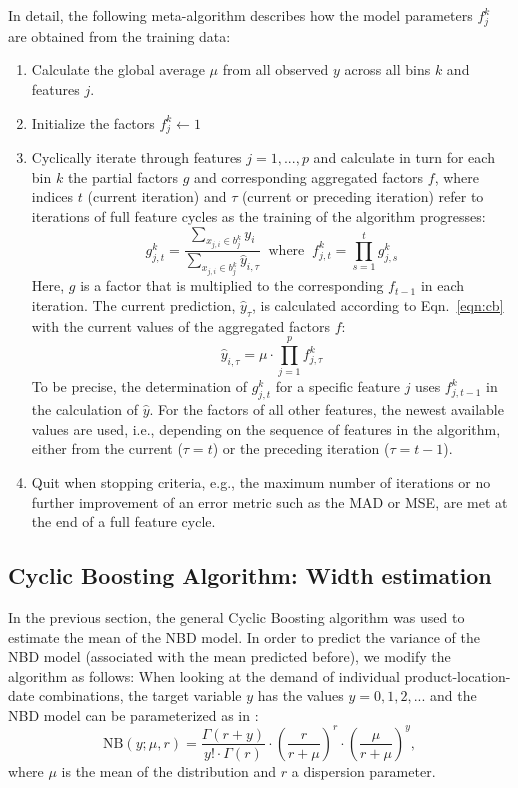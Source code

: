 \documentclass[BCOR=1mm, DIV=calc,10pt,
twoside=true,
twocolumn,
headings=normal]{scrartcl}
\newcommand{\eqn}{Eqn.~}
\begin{document}
In detail, the following meta-algorithm describes how the model parameters $f^k_j$ are obtained from the training data:
\begin{enumerate}
\item{Calculate the global average $\mu$ from all observed $y$ across all bins $k$ and features $j$.}
\item{Initialize the factors $f^k_j \leftarrow 1$}
\item{Cyclically iterate through features $j = 1,...,p $ and calculate in turn for each bin $k$ the partial factors $g$ and corresponding aggregated factors $f$, where indices $t$ (current iteration) and $\tau$ (current or preceding iteration) refer to iterations of full feature cycles as the training of the algorithm progresses:
\begin{equation} \label{factors}
g^k_{j,t} = \frac{\sum \limits_{x_{j,i} \in b^k_j} y_i}{\sum \limits_{x_{j,i} \in b^k_j} \hat{y}_{i,\tau}}\;\; \mathrm{where} \; \; f^k_{j,t} = \prod \limits_{s=1}^t g^k_{j,s}
\end{equation}
Here,  $g$ is a factor that is multiplied to the corresponding $f_{t-1}$ in each iteration. The current prediction, $\hat{y}_\tau$, is calculated according to \eqn \eqref{eqn:cb} with the current values of the aggregated factors $f$:
\begin{equation} \label{factors3}
\hat{y}_{i,\tau} = \mu \cdot \prod \limits_{j=1}^p f^k_{j,\tau}
\end{equation}
To be precise, the determination of $g^k_{j,t}$ for a specific feature $j$ uses $f^k_{j,t-1}$ in the calculation of $\hat{y}$. For the factors of all other features, the newest available values are used, i.e., depending on the sequence of features in the algorithm, either from the current ($\tau=t$) or the preceding iteration ($\tau=t-1$).}
\item{Quit when stopping criteria, e.g., the maximum number of iterations or no further improvement of an error metric such as the MAD or MSE, are met at the end of a full feature cycle.}
\end{enumerate}

\subsection{Cyclic Boosting Algorithm: Width estimation}
\label{sec:cb_width}

In the previous section, the general Cyclic Boosting algorithm was used to estimate the mean of the NBD model. In order to predict the variance of the NBD model (associated with the mean predicted before), we modify the algorithm as follows: When looking at the demand of individual product-location-date combinations, the target variable $y$ has the values $y = 0, 1, 2, ...$ and the NBD model can be parameterized as in \cite{hilbe2011negative}:
\begin{equation} \label{eqn:nbinom}
\mathrm{NB}(y; \mu, r) = \frac{\Gamma(r + y)}{y! \cdot \Gamma(r)} \cdot \left(\frac{r}{r + \mu}\right)^r \cdot \left(\frac{\mu}{r + \mu}\right)^y,
\end{equation}
where $\mu$ is the mean of the distribution and $r$ a dispersion parameter.
\end{document}
